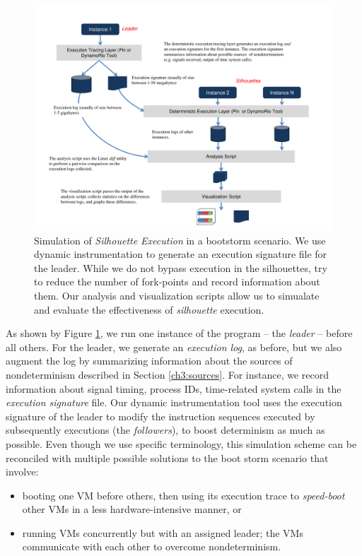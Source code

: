 \begin{figure}[]
  \center
  \includegraphics[scale=0.7, trim=1cm 0cm 1cm 0cm]
                  {simulation.pdf}
  \caption[Simulation of {\em Silhouette Execution} in a bootstorm scenario]%
  {Simulation of {\em Silhouette Execution} in a bootstorm scenario.
    We use dynamic instrumentation to 
    generate an execution signature file for the leader.
    While we do not bypass execution in the 
    silhouettes, try to reduce the number of fork-points 
    and record information about them.
    Our analysis and visualization
    scripts allow us to simualate and evaluate
    the effectiveness of {\em silhouette} execution.
  }
  \label{ch3:figsimulation}
\end{figure}

As shown by Figure \ref{ch3:figsimulation}, we run one instance of the
program -- the {\em leader} -- before all others.
For the leader, we generate an {\em execution log}, as before,
but we also augment the log by summarizing information about the sources of nondeterminism
described in Section \ref{ch3:sources}. For instance, we record
information about signal timing, process IDs, time-related system calls
in the {\em execution signature} file. Our dynamic instrumentation tool
uses the execution signature of the leader
to modify the instruction sequences executed by subsequently
executions (the {\em followers}), to boost determinism as much as possible.
Even though we use specific terminology, this simulation scheme can be
reconciled with multiple possible solutions to the 
boot storm scenario that involve:
\begin{itemize}
\item
booting one VM before others,
then using its execution trace to {\em speed-boot} other VMs
in a less hardware-intensive manner, or
\item 
running VMs concurrently but with an assigned leader;
the VMs communicate with each other to overcome
nondeterminism.
\end{itemize}

